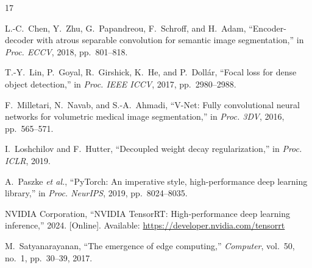 \documentclass[10pt,a4paper]{article}
\renewenvironment{thebibliography}[1]{
  \begin{oldthebibliography}{#1}
    \fontsize{7.8pt}{9.1pt}\selectfont
    \setlength{\itemsep}{0.0pt}
    \setlength{\parskip}{0pt}
}{\end{oldthebibliography}}
\begin{document}
\begin{thebibliography}{17}
L.-C.~Chen, Y.~Zhu, G.~Papandreou, F.~Schroff, and H.~Adam, ``Encoder-decoder with atrous separable convolution for semantic image segmentation,'' in \emph{Proc. ECCV}, 2018, pp.~801--818.

T.-Y.~Lin, P.~Goyal, R.~Girshick, K.~He, and P.~Doll{\'a}r, ``Focal loss for dense object detection,'' in \emph{Proc. IEEE ICCV}, 2017, pp.~2980--2988.

F.~Milletari, N.~Navab, and S.-A.~Ahmadi, ``V-Net: Fully convolutional neural networks for volumetric medical image segmentation,'' in \emph{Proc. 3DV}, 2016, pp.~565--571.

I.~Loshchilov and F.~Hutter, ``Decoupled weight decay regularization,'' in \emph{Proc. ICLR}, 2019.

A.~Paszke \emph{et al.}, ``PyTorch: An imperative style, high-performance deep learning library,'' in \emph{Proc. NeurIPS}, 2019, pp.~8024--8035.

NVIDIA Corporation, ``NVIDIA TensorRT: High-performance deep learning inference,'' 2024. [Online]. Available: \url{https://developer.nvidia.com/tensorrt}

M.~Satyanarayanan, ``The emergence of edge computing,'' \emph{Computer}, vol.~50, no.~1, pp.~30--39, 2017.
\end{thebibliography}
\end{document}
